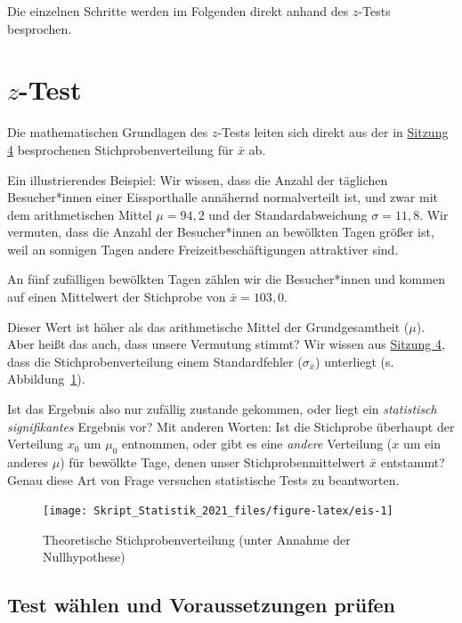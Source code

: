 \documentclass[
  11pt,
  ngerman,
  a4paper,
]{report}
\begin{document}
Die einzelnen Schritte werden im Folgenden direkt anhand des \(z\)-Tests besprochen.

\hypertarget{z-test}{%
\section{\texorpdfstring{\(z\)-Test}{z-Test}}\label{z-test}}

Die mathematischen Grundlagen des \(z\)-Tests leiten sich direkt aus der in \protect\hyperlink{stichprobenverteilung}{Sitzung 4} besprochenen Stichprobenverteilung für \(\bar{x}\) ab.

Ein illustrierendes Beispiel: Wir wissen, dass die Anzahl der täglichen Besucher*innen einer Eissporthalle annähernd normalverteilt ist, und zwar mit dem arithmetischen Mittel \(\mu=94{,}2\) und der Standardabweichung \(\sigma=11{,}8\). Wir vermuten, dass die Anzahl der Besucher*innen an bewölkten Tagen größer ist, weil an sonnigen Tagen andere Freizeitbeschäftigungen attraktiver sind.

An fünf zufälligen bewölkten Tagen zählen wir die Besucher*innen und kommen auf einen Mittelwert der Stichprobe von \(\bar{x} = 103{,}0\).

Dieser Wert ist höher als das arithmetische Mittel der Grundgesamtheit (\(\mu\)). Aber heißt das auch, dass unsere Vermutung stimmt? Wir wissen aus \protect\hyperlink{stichprobenverteilung}{Sitzung 4}, dass die Stichprobenverteilung einem Standardfehler (\(\sigma_{\bar{x}}\)) unterliegt (s. Abbildung~\ref{fig:eis}).

Ist das Ergebnis also nur zufällig zustande gekommen, oder liegt ein \emph{statistisch signifikantes} Ergebnis vor? Mit anderen Worten: Ist die Stichprobe überhaupt der Verteilung \(x_0\) um \(\mu_0\) entnommen, oder gibt es eine \emph{andere} Verteilung (\(x\) um ein anderes \(\mu\)) für bewölkte Tage, denen unser Stichprobenmittelwert \(\bar{x}\) entstammt? Genau diese Art von Frage versuchen statistische Tests zu beantworten.

\begin{figure}[!h]

{\centering \texttt{[image: Skript\_Statistik\_2021\_files/figure-latex/eis-1]} 

}

\caption{Theoretische Stichprobenverteilung (unter Annahme der Nullhypothese)}\label{fig:eis}
\end{figure}

\hypertarget{test-wuxe4hlen-und-voraussetzungen-pruxfcfen}{%
\subsection{Test wählen und Voraussetzungen prüfen}\label{test-wuxe4hlen-und-voraussetzungen-pruxfcfen}}
\end{document}

